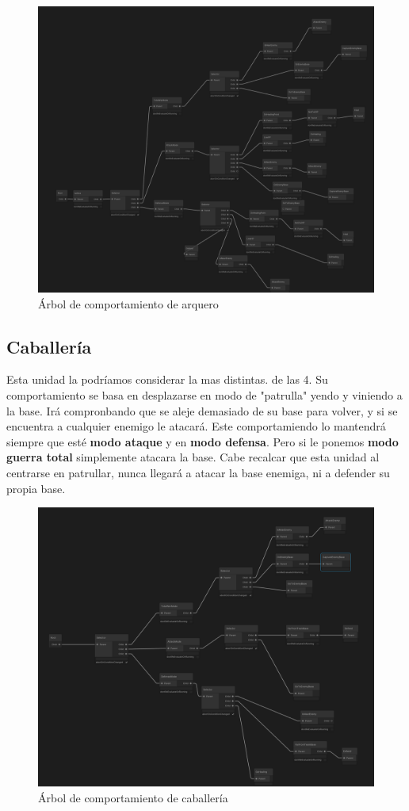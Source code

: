 \begin{figure}[H]
    \centering
    \includegraphics[scale=0.4]{doc/images/ArbolArqueros.png}
    \caption{Árbol de comportamiento de arquero}
    \label{fig:archer}
\end{figure}
\subsection{Caballería} 
Esta unidad la podríamos considerar la mas distintas. de las 4. Su comportamiento se basa en desplazarse en modo de "patrulla" yendo y viniendo a la base. Irá compronbando que se aleje demasiado de su base para volver, y si se encuentra a cualquier enemigo le atacará. Este comportamiendo lo mantendrá siempre que esté \textbf{modo ataque} y en \textbf{modo defensa}. Pero si le ponemos \textbf{modo guerra total} simplemente atacara la base. Cabe recalcar que esta unidad al centrarse en patrullar, nunca llegará a atacar la base enemiga, ni a defender su propia base.

\begin{figure}[H]
    \centering
    \includegraphics[scale=0.4]{doc/images/ArbolCaballeria.png}
    \caption{Árbol de comportamiento de caballería}
    \label{fig:horse}
\end{figure}
